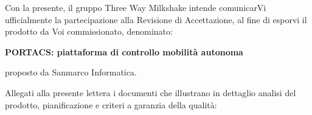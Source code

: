 \documentclass[10pt,stdletter,dateno,sigright]{newlfm}  %
\begin{document}
    \begin{newlfm}


        Con la presente, il gruppo Three Way Milkshake intende comunicarVi ufficialmente la partecipazione alla Revisione di Accettazione, al fine di esporvi il prodotto da Voi commissionato, denominato:
        \begin{center}
            \textbf{PORTACS: piattaforma di controllo mobilità autonoma}
        \end{center}
        proposto da Sanmarco Informatica.

        Allegati alla presente lettera i documenti che illustrano in dettaglio analisi del prodotto, pianificazione e criteri a garanzia della qualità:


\end{newlfm}
\end{document}

